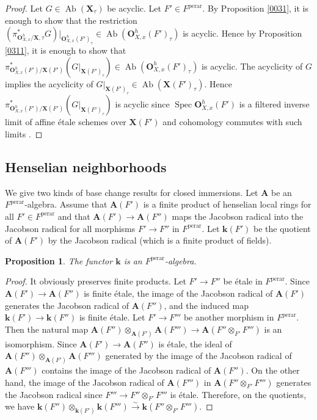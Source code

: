 \documentclass{amsart}
\newtheorem{Prop}[Thm]{Proposition}
\theoremstyle{remark}
\numberwithin{equation}{subsection}
\newcommand{\isomto}{\overset{\sim}{\to}}
\newcommand{\tensor}{\mathbin{\otimes}}
\newcommand{\perar}{\mathrm{perar}}
\newcommand{\alg}[1]{\mathbf{#1}}
\DeclareMathOperator{\Spec}{Spec}
\DeclareMathOperator{\Ab}{Ab}
\begin{document}
\begin{proof}
	Let $G \in \Ab(\alg{X}_{\tau})$ be acyclic.
	Let $F' \in F^{\perar}$.
	By Proposition \ref{0031},
	it is enough to show that the restriction
		$
				(
					\pi_{\alg{O}_{X, x}^{h} / \alg{X}, \tau}^{\ast} G
				)|_{\alg{O}_{X, x}^{h}(F')_{\tau}}
			\in
				\Ab(\alg{O}_{X, x}^{h}(F')_{\tau})
		$
	is acyclic.
	Hence by Proposition \ref{0311},
	it is enough to show that
		$
				\pi_{\alg{O}_{X, x}^{h}(F') / \alg{X}(F')}^{\ast}(
					 G|_{\alg{X}(F')_{\tau}}
				)
			\in
				\Ab(\alg{O}_{X, x}^{h}(F')_{\tau})
		$
	is acyclic.
	The acyclicity of $G$ implies the acyclicity of
	$G|_{\alg{X}(F')_{\tau}} \in \Ab(\alg{X}(F')_{\tau})$.
	Hence
		$
			\pi_{\alg{O}_{X, x}^{h}(F') / \alg{X}(F')}^{\ast}(
				 G|_{\alg{X}(F')_{\tau}}
			)
		$
	is acyclic
	since $\Spec \alg{O}_{X, x}^{h}(F')$ is a filtered inverse limit of
	affine \'etale schemes over $\alg{X}(F')$
	and cohomology commutes with such limits \cite[Expos\'e VII, Corollaire 5.9]{AGV72b}.
\end{proof}


\subsection{Henselian neighborhoods}

We give two kinds of base change results
for closed immersions.
Let $\alg{A}$ be an $F^{\perar}$-algebra.
Assume that $\alg{A}(F')$ is a finite product of henselian local rings for all $F' \in F^{\perar}$
and that $\alg{A}(F') \to \alg{A}(F'')$ maps the Jacobson radical into the Jacobson radical
for all morphisms $F' \to F''$ in $F^{\perar}$.
Let $\alg{k}(F')$ be the quotient of $\alg{A}(F')$ by the Jacobson radical
(which is a finite product of fields).

\begin{Prop}
	The functor $\alg{k}$ is an $F^{\perar}$-algebra.
\end{Prop}

\begin{proof}
	It obviously preserves finite products.
	Let $F' \to F''$ be \'etale in $F^{\perar}$.
	Since $\alg{A}(F') \to \alg{A}(F'')$ is finite \'etale,
	the image of the Jacobson radical of $\alg{A}(F')$ generates the Jacobson radical of $\alg{A}(F'')$,
	and the induced map $\alg{k}(F') \to \alg{k}(F'')$ is finite \'etale.
	Let $F' \to F'''$ be another morphism in $F^{\perar}$.
	Then the natural map
	$\alg{A}(F'') \tensor_{\alg{A}(F')} \alg{A}(F''') \to \alg{A}(F'' \tensor_{F'} F''')$
	is an isomorphism.
	Since $\alg{A}(F') \to \alg{A}(F'')$ is \'etale,
	the ideal of $\alg{A}(F'') \tensor_{\alg{A}(F')} \alg{A}(F''')$
	generated by the image of the Jacobson radical of $\alg{A}(F''')$
	contains the image of the Jacobson radical of $\alg{A}(F'')$.
	On the other hand, the image of the Jacobson radical of $\alg{A}(F''')$ in $\alg{A}(F'' \tensor_{F'} F''')$
	generates the Jacobson radical
	since $F''' \to F'' \tensor_{F'} F'''$ is \'etale.
	Therefore, on the quotients, we have
	$\alg{k}(F'') \tensor_{\alg{k}(F')} \alg{k}(F''') \isomto \alg{k}(F'' \tensor_{F'} F''')$.
\end{proof}
\end{document}
